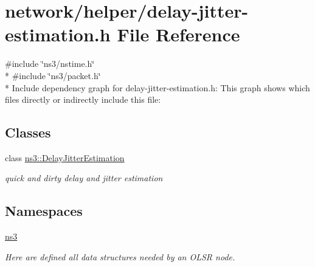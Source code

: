 \hypertarget{delay-jitter-estimation_8h}{}\section{network/helper/delay-\/jitter-\/estimation.h File Reference}
\label{delay-jitter-estimation_8h}
{\ttfamily \#include \char`\"{}ns3/nstime.\+h\char`\"{}}\\*
{\ttfamily \#include \char`\"{}ns3/packet.\+h\char`\"{}}\\*
Include dependency graph for delay-\/jitter-\/estimation.h\+:
This graph shows which files directly or indirectly include this file\+:
\subsection*{Classes}
\begin{DoxyCompactItemize}
\item 
class \hyperlink{classns3_1_1DelayJitterEstimation}{ns3\+::\+Delay\+Jitter\+Estimation}
\begin{DoxyCompactList}\small\item\em quick and dirty delay and jitter estimation \end{DoxyCompactList}\end{DoxyCompactItemize}
\subsection*{Namespaces}
\begin{DoxyCompactItemize}
\item 
 \hyperlink{namespacens3}{ns3}
\begin{DoxyCompactList}\small\item\em Here are defined all data structures needed by an O\+L\+SR node. \end{DoxyCompactList}\end{DoxyCompactItemize}
